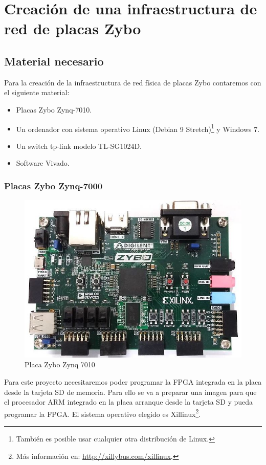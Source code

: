 \section{Creación de una infraestructura de red de placas Zybo}
\subsection{Material necesario}
Para la creación de la infraestructura de red física de placas Zybo contaremos con el siguiente material:
\begin{itemize}
	\item Placas Zybo Zynq-7010.
	\item Un ordenador con sistema operativo Linux (Debian 9 Stretch)\footnote{También es posible usar cualquier otra distribución de Linux.} y Windows 7.
	\item Un switch tp-link modelo TL-SG1024D.
	\item Software Vivado.
\end{itemize}

\subsubsection{Placas Zybo Zynq-7000}
\begin{figure}[h]
	\centering
	\includegraphics[scale=0.5]{Anexos/Anexo2/Infraestructura/zybo.jpg}
	\caption{Placa Zybo Zynq 7010}
	\label{Placa Zybo}
\end{figure}
Para este proyecto necesitaremos poder programar la FPGA integrada en la placa desde la tarjeta SD de memoria. Para ello se va a preparar una imagen para que el procesador ARM integrado en la placa arranque desde la tarjeta SD y pueda programar la FPGA. El sistema operativo elegido es Xillinux\footnote{Más información en: \url{http://xillybus.com/xillinux}.}.

